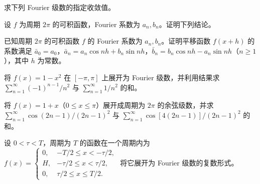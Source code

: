 \noindent\begin{minipage}{\textwidth}
求下列 Fourier 级数的指定收敛值。
\end{minipage}\par\vfill
\newpage
\noindent\begin{minipage}{\textwidth}
设 $f$ 为周期 $2\pi$ 的可积函数，Fourier 系数为 $a_n,b_n$。证明下列结论。
\end{minipage}\par\vfill
\noindent\begin{minipage}{\textwidth}
已知周期 $2\pi$ 的可积函数 $f$ 的 Fourier 系数为 $a_n,b_n$。证明平移函数 $f(x+h)$ 的系数满足 $\bar a_0=a_0$，$\bar a_n=a_n\cos nh+b_n\sin nh$，$\bar b_n=b_n\cos nh-a_n\sin nh$（$n\ge1$），其中 $h$ 为常数。
\end{minipage}\par\vfill
\noindent\begin{minipage}{\textwidth}
将 $f(x)=1-x^2$ 在 $[-\pi,\pi]$ 上展开为 Fourier 级数，并利用结果求 $\sum_{n=1}^{\infty}(-1)^{n-1}/n^2$ 与 $\sum_{n=1}^{\infty}1/n^2$ 的和。
\end{minipage}\par\vfill
\noindent\begin{minipage}{\textwidth}
将 $f(x)=1+x$（$0\le x\le\pi$）展开成周期为 $2\pi$ 的余弦级数，并求 $\sum_{n=1}^{\infty}\cos(2n-1)/(2n-1)^2$ 与 $\sum_{n=1}^{\infty}\cos[4(2n-1)]/(2n-1)^2$ 的和。
\end{minipage}\par\vfill
\newpage
\noindent\begin{minipage}{\textwidth}
设 $0<\tau<T$，周期为 $T$ 的函数在一个周期内为 $f(x)=\begin{cases}0,&-T/2\le x<-\tau/2,\\H,&-\tau/2\le x<\tau/2,\\0,&\tau/2\le x\le T/2.\end{cases}$ 将它展开为 Fourier 级数的复数形式。
\end{minipage}\par\vfill
